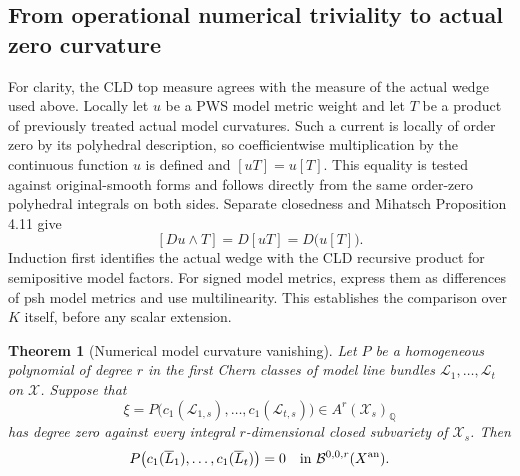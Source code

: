 \documentclass[11pt]{article}
\newtheorem{theorem}{Theorem}[section]
\theoremstyle{definition}
\theoremstyle{remark}
\numberwithin{equation}{section}
\begin{document}
\subsection{From operational numerical triviality to actual zero curvature}

For clarity, the CLD top measure agrees with the measure of the actual
wedge used above.  Locally let $u$ be a PWS model metric weight and let
$T$ be a product of previously treated actual model curvatures.  Such a
current is locally of order zero by its polyhedral description, so
coefficientwise multiplication by the continuous function $u$ is defined
and $[uT]=u[T]$. This equality is tested against original-smooth forms
and follows directly from the same order-zero polyhedral integrals
on both sides. Separate closedness and Mihatsch Proposition 4.11 give
\[
                  [Du\wedge T]=D[uT]=D\bigl(u[T]\bigr).
\]
Induction first identifies the actual wedge with the CLD recursive
product for semipositive model factors. For signed model metrics,
express them as differences of psh model
metrics and use multilinearity.  This establishes the comparison over
$K$ itself, before any scalar extension.

\begin{theorem}[Numerical model curvature vanishing]
\label{r10c:numerical-zero}
Let $P$ be a homogeneous polynomial of degree $r$ in the first Chern
classes of model line bundles $\mathcal L_1,\ldots,\mathcal L_t$ on
$\mathcal X$.  Suppose that
\[
       \xi=P\bigl(c_1(\mathcal L_{1,s}),\ldots,
                    c_1(\mathcal L_{t,s})\bigr)\in A^r(\mathcal X_s)_{\mathbb Q}
\]
has degree zero against every integral $r$-dimensional closed subvariety
of $\mathcal X_s$.  Then
\[
        P\bigl(c_1(\overline L_1),\ldots,c_1(\overline L_t)\bigr)=0
                 \quad\hbox{in }\mathcal B^{0,0,r}(X^{\rm an}).
\]
\end{theorem}
\end{document}
